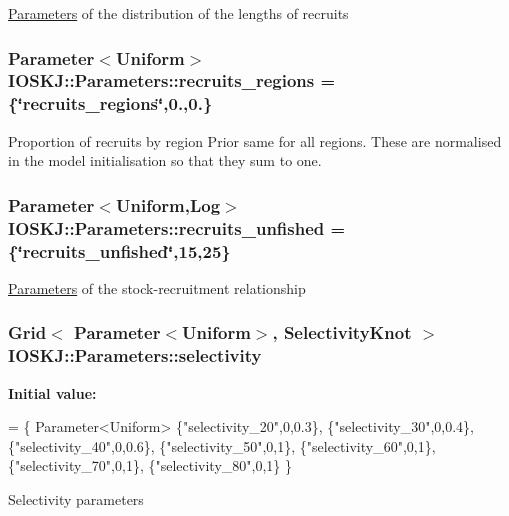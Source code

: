 \hyperlink{classIOSKJ_1_1Parameters}{Parameters} of the distribution of the lengths of recruits \hypertarget{classIOSKJ_1_1Parameters_a9631eb719ef2cb669a3214d3377be1d8}{
\subsubsection[{recruits\-\_\-regions}]{\setlength{\rightskip}{0pt plus 5cm}Parameter$<$Uniform$>$ I\-O\-S\-K\-J\-::\-Parameters\-::recruits\-\_\-regions = \{\char`\"{}recruits\-\_\-regions\char`\"{},0.,0.\}}}\label{classIOSKJ_1_1Parameters_a9631eb719ef2cb669a3214d3377be1d8}
Proportion of recruits by region Prior same for all regions. These are normalised in the model initialisation so that they sum to one. \hypertarget{classIOSKJ_1_1Parameters_a8923bdd52289ed5e29436b222121927e}{
\subsubsection[{recruits\-\_\-unfished}]{\setlength{\rightskip}{0pt plus 5cm}Parameter$<$Uniform,Log$>$ I\-O\-S\-K\-J\-::\-Parameters\-::recruits\-\_\-unfished = \{\char`\"{}recruits\-\_\-unfished\char`\"{},15,25\}}}\label{classIOSKJ_1_1Parameters_a8923bdd52289ed5e29436b222121927e}
\hyperlink{classIOSKJ_1_1Parameters}{Parameters} of the stock-\/recruitment relationship \hypertarget{classIOSKJ_1_1Parameters_a5a522175284238012b5c49d7bd33a85a}{
\subsubsection[{selectivity}]{\setlength{\rightskip}{0pt plus 5cm}Grid$<$ Parameter$<$Uniform$>$, Selectivity\-Knot $>$ I\-O\-S\-K\-J\-::\-Parameters\-::selectivity}}\label{classIOSKJ_1_1Parameters_a5a522175284238012b5c49d7bd33a85a}
{\bfseries Initial value\-:}
\begin{DoxyCode}
= \{
        Parameter<Uniform>
        \{\textcolor{stringliteral}{"selectivity\_20"},0,0.3\},
        \{\textcolor{stringliteral}{"selectivity\_30"},0,0.4\},
        \{\textcolor{stringliteral}{"selectivity\_40"},0,0.6\},
        \{\textcolor{stringliteral}{"selectivity\_50"},0,1\},
        \{\textcolor{stringliteral}{"selectivity\_60"},0,1\},
        \{\textcolor{stringliteral}{"selectivity\_70"},0,1\},
        \{\textcolor{stringliteral}{"selectivity\_80"},0,1\}
    \}
\end{DoxyCode}
Selectivity parameters

